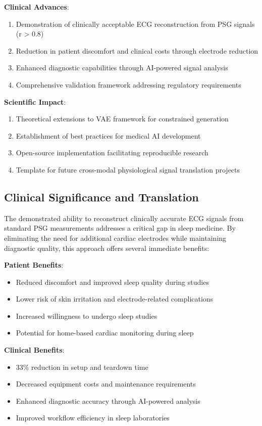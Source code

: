 \documentclass[11pt]{article}
\begin{document}
\textbf{Clinical Advances}:
\begin{enumerate}
    \item Demonstration of clinically acceptable ECG reconstruction from PSG signals (r > 0.8)
    \item Reduction in patient discomfort and clinical costs through electrode reduction
    \item Enhanced diagnostic capabilities through AI-powered signal analysis
    \item Comprehensive validation framework addressing regulatory requirements
\end{enumerate}

\textbf{Scientific Impact}:
\begin{enumerate}
    \item Theoretical extensions to VAE framework for constrained generation
    \item Establishment of best practices for medical AI development
    \item Open-source implementation facilitating reproducible research
    \item Template for future cross-modal physiological signal translation projects
\end{enumerate}

\subsection{Clinical Significance and Translation}

The demonstrated ability to reconstruct clinically accurate ECG signals from standard PSG measurements addresses a critical gap in sleep medicine. By eliminating the need for additional cardiac electrodes while maintaining diagnostic quality, this approach offers several immediate benefits:

\textbf{Patient Benefits}:
\begin{itemize}
    \item Reduced discomfort and improved sleep quality during studies
    \item Lower risk of skin irritation and electrode-related complications
    \item Increased willingness to undergo sleep studies
    \item Potential for home-based cardiac monitoring during sleep
\end{itemize}

\textbf{Clinical Benefits}:
\begin{itemize}
    \item 33\% reduction in setup and teardown time
    \item Decreased equipment costs and maintenance requirements
    \item Enhanced diagnostic accuracy through AI-powered analysis
    \item Improved workflow efficiency in sleep laboratories
\end{itemize}
\end{document}
